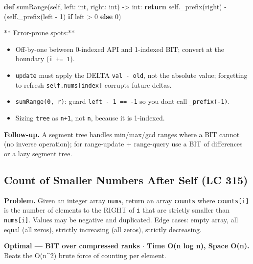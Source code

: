 \documentclass[11pt]{article}
\providecommand{\tightlist}{\setlength{\itemsep}{1pt}\setlength{\parskip}{0pt}}
\newenvironment{Shaded}{\begin{snugshade}}{\end{snugshade}}
\newcommand{\BuiltInTok}[1]{\textcolor[rgb]{0.50,0.55,0.55}{#1}}
\newcommand{\ControlFlowTok}[1]{\textcolor[rgb]{0.99,0.74,0.29}{\textbf{#1}}}
\newcommand{\DecValTok}[1]{\textcolor[rgb]{0.96,0.45,0.00}{#1}}
\newcommand{\KeywordTok}[1]{\textcolor[rgb]{0.81,0.81,0.76}{\textbf{#1}}}
\newcommand{\NormalTok}[1]{\textcolor[rgb]{0.81,0.81,0.76}{#1}}
\newcommand{\OperatorTok}[1]{\textcolor[rgb]{0.81,0.81,0.76}{#1}}
\newcommand{\VariableTok}[1]{\textcolor[rgb]{0.15,0.68,0.68}{#1}}
\begin{document}
\begin{Shaded}
\begin{Highlighting}[]
    \KeywordTok{def}\NormalTok{ sumRange(}\VariableTok{self}\NormalTok{, left: }\BuiltInTok{int}\NormalTok{, right: }\BuiltInTok{int}\NormalTok{) }\OperatorTok{{-}\textgreater{}} \BuiltInTok{int}\NormalTok{:}
        \ControlFlowTok{return} \VariableTok{self}\NormalTok{.\_prefix(right) }\OperatorTok{{-}}\NormalTok{ (}\VariableTok{self}\NormalTok{.\_prefix(left }\OperatorTok{{-}} \DecValTok{1}\NormalTok{) }\ControlFlowTok{if}\NormalTok{ left }\OperatorTok{\textgreater{}} \DecValTok{0} \ControlFlowTok{else} \DecValTok{0}\NormalTok{)}
\end{Highlighting}
\end{Shaded}

** Error-prone spots:**

\begin{itemize}
\tightlist
\item
  Off-by-one between 0-indexed API and 1-indexed BIT; convert at the boundary (\texttt{i\ +=\ 1}).
\item
  \texttt{update} must apply the DELTA \texttt{val\ -\ old}, not the absolute value; forgetting to refresh \texttt{self.nums{[}index{]}} corrupts future deltas.
\item
  \texttt{sumRange(0,\ r)}: guard \texttt{left\ -\ 1\ ==\ -1} so you don\textquotesingle t call \texttt{\_prefix(-1)}.
\item
  Sizing \texttt{tree} as \texttt{n+1}, not \texttt{n}, because it is 1-indexed.
\end{itemize}

\textbf{Follow-up.} A segment tree handles min/max/gcd ranges where a BIT cannot (no inverse operation); for range-update + range-query use a BIT of differences or a lazy segment tree.

\subsection{Count of Smaller Numbers After Self (LC 315)}\label{count-of-smaller-numbers-after-self-lc-315}

\textbf{Problem.} Given an integer array \texttt{nums}, return an array \texttt{counts} where \texttt{counts{[}i{]}} is the number of elements to the RIGHT of \texttt{i} that are strictly smaller than \texttt{nums{[}i{]}}. Values may be negative and duplicated. Edge cases: empty array, all equal (all zeros), strictly increasing (all zeros), strictly decreasing.

\textbf{Optimal --- BIT over compressed ranks \(\cdot\) Time O(n log n), Space O(n).} Beats the O(n\^{}2) brute force of counting per element.
\end{document}
